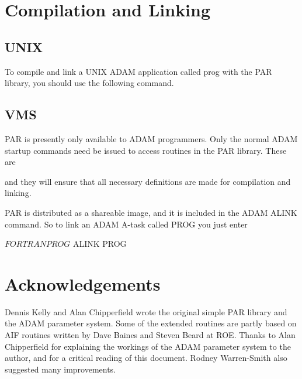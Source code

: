 \documentclass[twoside,11pt,nolof]{starlink}
\begin{document}
\section{Compilation and Linking}

\subsection{UNIX}

To compile and link a UNIX {\footnotesize ADAM} application called prog
with the PAR library, you should use the following command.

\begin{terminalv}
\end{terminalv}

\subsection{VMS}

PAR is presently only available to {\footnotesize ADAM} programmers.
Only the normal ADAM startup commands need be issued to access routines
in the PAR library.  These are


and they will ensure that all necessary definitions are made for
compilation and linking.

PAR is distributed as a shareable image, and it is included in the
{\footnotesize ADAM} ALINK command.  So to link an {\footnotesize ADAM}
A-task called PROG you just enter

\begin{terminalv}
$ FORTRAN PROG
$ ALINK PROG
\end{terminalv}

\section{Acknowledgements}

Dennis Kelly and Alan Chipperfield wrote the original simple PAR library
and the {\footnotesize ADAM} parameter system.  Some of the extended
routines are partly based on AIF routines written by Dave Baines and
Steven Beard at ROE.  Thanks to Alan Chipperfield for explaining the
workings of the {\footnotesize ADAM} parameter system to the author, and
for a critical reading of this document.  Rodney Warren-Smith also
suggested many improvements.
\end{document}
